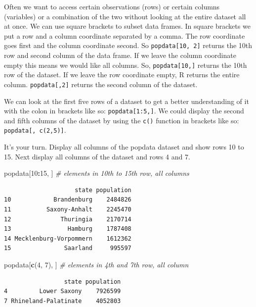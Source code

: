 \documentclass[]{article}
\newenvironment{Shaded}{\begin{snugshade}}{\end{snugshade}}
\newcommand{\KeywordTok}[1]{\textcolor[rgb]{0.13,0.29,0.53}{\textbf{#1}}}
\newcommand{\DecValTok}[1]{\textcolor[rgb]{0.00,0.00,0.81}{#1}}
\newcommand{\CommentTok}[1]{\textcolor[rgb]{0.56,0.35,0.01}{\textit{#1}}}
\newcommand{\OperatorTok}[1]{\textcolor[rgb]{0.81,0.36,0.00}{\textbf{#1}}}
\newcommand{\NormalTok}[1]{#1}
\theoremstyle{definition}
\theoremstyle{definition}
\theoremstyle{definition}
\theoremstyle{remark}
\begin{document}
Often we want to access certain observations (rows) or certain columns
(variables) or a combination of the two without looking at the entire
dataset all at once. We can use square brackets to subset data frames.
In square brackets we put a row and a column coordinate separated by a
comma. The row coordinate goes first and the column coordinate second.
So \texttt{popdata{[}10,\ 2{]}} returns the 10th row and second column
of the data frame. If we leave the column coordinate empty this means we
would like all columns. So, \texttt{popdata{[}10,{]}} returns the 10th
row of the dataset. If we leave the row coordinate empty, R returns the
entire column. \texttt{popdata{[},2{]}} returns the second column of the
dataset.

We can look at the first five rows of a dataset to get a better
understanding of it with the colon in brackets like so:
\texttt{popdata{[}1:5,{]}}. We could display the second and fifth
columns of the dataset by using the \texttt{c()} function in brackets
like so: \texttt{popdata{[},\ c(2,5){]}}.

It's your turn. Display all columns of the popdata dataset and show rows
10 to 15. Next display all columns of the dataset and rows 4 and 7.

\begin{Shaded}
\begin{Highlighting}[]
\NormalTok{popdata[}\DecValTok{10}\OperatorTok{:}\DecValTok{15}\NormalTok{, ] }\CommentTok{# elements in 10th to 15th row, all columns}
\end{Highlighting}
\end{Shaded}

\begin{verbatim}
                    state population
10            Brandenburg    2484826
11          Saxony-Anhalt    2245470
12              Thuringia    2170714
13                Hamburg    1787408
14 Mecklenburg-Vorpommern    1612362
15               Saarland     995597
\end{verbatim}

\begin{Shaded}
\begin{Highlighting}[]
\NormalTok{popdata[}\KeywordTok{c}\NormalTok{(}\DecValTok{4}\NormalTok{, }\DecValTok{7}\NormalTok{), ] }\CommentTok{# elements in 4th and 7th row, all column}
\end{Highlighting}
\end{Shaded}

\begin{verbatim}
                 state population
4         Lower Saxony    7926599
7 Rhineland-Palatinate    4052803
\end{verbatim}
\end{document}
